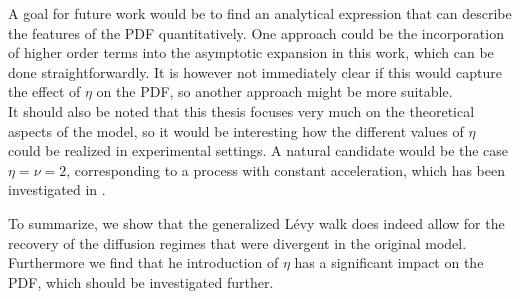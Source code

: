 A goal for future work would be to find an analytical expression that can describe the features of the PDF quantitatively. One approach could be the incorporation of higher order terms into the asymptotic expansion in this work, which can be done straightforwardly. It is however not immediately clear if this would capture the effect of $\eta$ on the \gls*{PDF}, so another approach might be more suitable.\\
It should also be noted that this thesis focuses very much on the theoretical aspects of the model, so it would be interesting how the different values of $\eta$ could be realized in experimental settings. A natural candidate would be the case $\eta=\nu=2$, corresponding to a process with constant acceleration, which has been investigated in 
\cite{burioni2013rare, burioni2014scaling}.

To summarize, we show that the generalized L\'evy walk does indeed allow for the recovery of the diffusion regimes that were divergent in the original model. Furthermore we find that he introduction of $\eta$ has a significant impact on the \gls*{PDF}, which should be investigated further.

